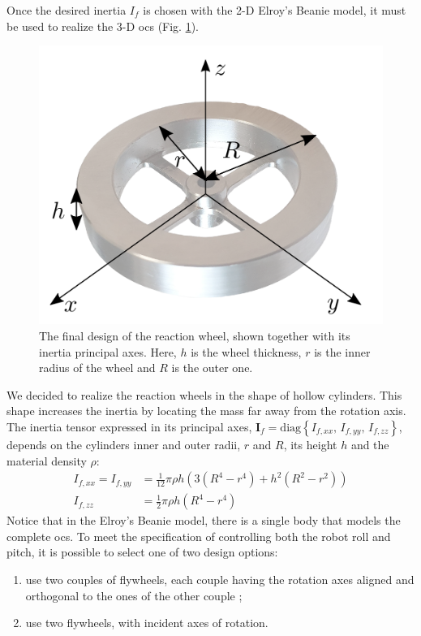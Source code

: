 \documentclass[letterpaper, 10 pt, conference]{ieeeconf}  %
\begin{document}
Once the desired inertia $I_f$ is chosen with the 2-D Elroy's Beanie model, it must be used to realize the 3-D \gls{ocs} (Fig. \ref{fig:flywheel}). 
\begin{figure}
	\centering
	\includegraphics[width=0.7\linewidth]{figures/flywheel_opaque.png}
	\caption{\small The final design of the reaction wheel, shown together with its inertia principal axes. Here, $h$ is the wheel thickness, $r$ is the inner radius of the wheel and $R$ is the outer one.}
	\label{fig:flywheel}
\end{figure}
We decided to realize the reaction wheels in the shape of hollow cylinders. This shape increases the inertia by locating the mass far away from the rotation axis. The inertia tensor expressed in its principal axes, $\bm{I}_f = \mathrm{diag}\left\{ I_{f, xx}, \, I_{f, yy}, \, I_{f, zz}  \right\}$, depends on the cylinders inner and outer radii, $r$ and $R$, its height $h$ and the material density $\rho$:
\begin{equation}
\begin{split}
I_{f, xx} = I_{f, yy} &= \frac{1}{12}\pi \rho h \left(3\left(R^4 - r^4\right) + h^2\left(R^2 - r^2\right)\right) \\
I_{f, zz} &= \frac{1}{2}\pi \rho h \left(R^4 - r^4\right)
\end{split}
\end{equation}
Notice that in the Elroy's Beanie model, there is a single body that models the complete \gls{ocs}. To meet the specification of controlling both the robot roll and pitch, it is possible to select one of two design options:
\begin{enumerate}
	\item use two couples of flywheels, each couple having the rotation axes aligned and orthogonal to the ones of the other couple ; 
	\item use two flywheels, with incident axes of rotation.
\end{enumerate}
\end{document}
